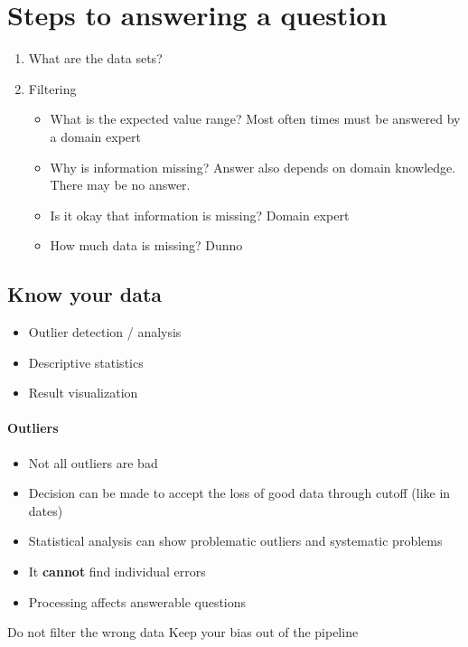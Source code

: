 \documentclass[10pt,a4paper]{scrreprt}
\begin{document}
\section{Steps to answering a question}
\begin{enumerate}
	\item What are the data sets?
	\item Filtering
	\begin{itemize}
		\item What is the expected value range?
		\subitem Most often times must be answered by a domain expert
		\item Why is information missing? 
		\subitem Answer also depends on domain knowledge. There may be no answer.
		\item Is it okay that information is missing?
		\subitem Domain expert
		\item How much data is missing?
		\subitem Dunno
	\end{itemize}
\end{enumerate}

\subsection{Know your data}
\begin{itemize}
	\item Outlier detection / analysis
	\item Descriptive statistics
	\item Result visualization
\end{itemize}

\paragraph{Outliers}
\begin{itemize}
	\item Not all outliers are bad
	\item Decision can be made to accept the loss of good data through cutoff (like in dates)
	\item Statistical analysis can show problematic outliers and systematic problems
	\item It \textbf{cannot} find individual errors
	\item Processing affects answerable questions
\end{itemize}
\large{Do not filter the wrong data}
\large{Keep your bias out of the pipeline}


\end{document}
